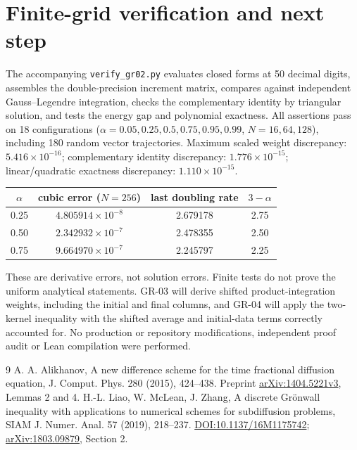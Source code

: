 \documentclass[11pt,a4paper]{article}
\begin{document}
\section{Finite-grid verification and next step}
The accompanying \texttt{verify\_gr02.py} evaluates closed forms at 50 decimal digits, assembles the double-precision increment matrix, compares against independent Gauss--Legendre integration, checks the complementary identity by triangular solution, and tests the energy gap and polynomial exactness. All assertions pass on 18 configurations ($\alpha=0.05,0.25,0.5,0.75,0.95,0.99$, $N=16,64,128$), including 180 random vector trajectories. Maximum scaled weight discrepancy: $5.416\times10^{-16}$; complementary identity discrepancy: $1.776\times10^{-15}$; linear/quadratic exactness discrepancy: $1.110\times10^{-15}$.
\begin{center}
\begin{tabular}{cccc}\toprule
$\alpha$ & cubic error ($N=256$) & last doubling rate & $3-\alpha$\\\midrule
0.25 & $4.805914\times10^{-8}$ & 2.679178 & 2.75\\
0.50 & $2.342932\times10^{-7}$ & 2.478355 & 2.50\\
0.75 & $9.664970\times10^{-7}$ & 2.245797 & 2.25\\\bottomrule
\end{tabular}
\end{center}
These are derivative errors, not solution errors. Finite tests do not prove the uniform analytical statements. GR-03 will derive shifted product-integration weights, including the initial and final columns, and GR-04 will apply the two-kernel inequality with the shifted average and initial-data terms correctly accounted for. No production or repository modifications, independent proof audit or Lean compilation were performed.
\begin{thebibliography}{9}
 A. A. Alikhanov, A new difference scheme for the time fractional diffusion equation, J. Comput. Phys. 280 (2015), 424--438. Preprint \href{https://arxiv.org/abs/1404.5221}{arXiv:1404.5221v3}, Lemmas 2 and 4.
 H.-L. Liao, W. McLean, J. Zhang, A discrete Gr\"onwall inequality with applications to numerical schemes for subdiffusion problems, SIAM J. Numer. Anal. 57 (2019), 218--237. \href{https://doi.org/10.1137/16M1175742}{DOI:10.1137/16M1175742}; \href{https://arxiv.org/abs/1803.09879}{arXiv:1803.09879}, Section 2.
\end{thebibliography}
\end{document}
